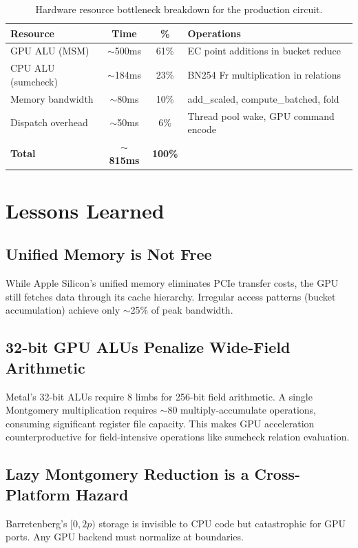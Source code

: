 \documentclass[11pt,a4paper]{article}
\begin{document}
\begin{table}[H]
\centering
\begin{tabular}{lccp{6cm}}
\toprule
\textbf{Resource} & \textbf{Time} & \textbf{\%} & \textbf{Operations} \\
\midrule
GPU ALU (MSM) & $\sim$500ms & 61\% & EC point additions in bucket reduce \\
CPU ALU (sumcheck) & $\sim$184ms & 23\% & BN254 Fr multiplication in relations \\
Memory bandwidth & $\sim$80ms & 10\% & add\_scaled, compute\_batched, fold \\
Dispatch overhead & $\sim$50ms & 6\% & Thread pool wake, GPU command encode \\
\midrule
\textbf{Total} & \textbf{$\sim$815ms} & \textbf{100\%} & \\
\bottomrule
\end{tabular}
\caption{Hardware resource bottleneck breakdown for the production circuit.}
\end{table}

\section{Lessons Learned}

\subsection{Unified Memory is Not Free}
While Apple Silicon's unified memory eliminates PCIe transfer costs, the GPU still fetches data through its cache hierarchy. Irregular access patterns (bucket accumulation) achieve only $\sim$25\% of peak bandwidth.

\subsection{32-bit GPU ALUs Penalize Wide-Field Arithmetic}
Metal's 32-bit ALUs require 8 limbs for 256-bit field arithmetic. A single Montgomery multiplication requires $\sim$80 multiply-accumulate operations, consuming significant register file capacity. This makes GPU acceleration counterproductive for field-intensive operations like sumcheck relation evaluation.

\subsection{Lazy Montgomery Reduction is a Cross-Platform Hazard}
Barretenberg's $[0, 2p)$ storage is invisible to CPU code but catastrophic for GPU ports. Any GPU backend must normalize at boundaries.
\end{document}
